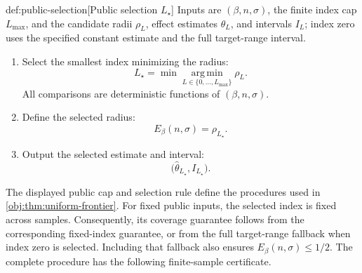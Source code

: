 \documentclass[11pt]{article}
\begin{document}
\begin{algorithmv}{def:public-selection}[Public selection $L_\star$]
Inputs are \((\beta,n,\sigma)\), the finite index cap \(L_{\max}\), and the candidate radii \(\rho_L\), effect estimates \(\widehat\theta_L\), and intervals \(I_L\); index zero uses the specified constant estimate and the full target-range interval.
\begin{enumerate}
\item Select the smallest index minimizing the radius:
\[
L_\star
=
\min\operatorname*{arg\,min}_{L\in\{0,\ldots,L_{\max}\}}
\rho_L.
\]
All comparisons are deterministic functions of \((\beta,n,\sigma)\).
\item Define the selected radius:
\[
E_\beta(n,\sigma)=\rho_{L_\star}.
\]
\item Output the selected estimate and interval:
\[
\bigl(\widehat\theta_{L_\star},I_{L_\star}\bigr).
\]
\end{enumerate}
\end{algorithmv}

The displayed public cap and selection rule define the procedures used in \cref{obj:thm:uniform-frontier}. For fixed public inputs, the selected index is fixed across samples. Consequently, its coverage guarantee follows from the corresponding fixed-index guarantee, or from the full target-range fallback when index zero is selected. Including that fallback also ensures \(E_\beta(n,\sigma)\le1/2\). The complete procedure has the following finite-sample certificate.
\end{document}
